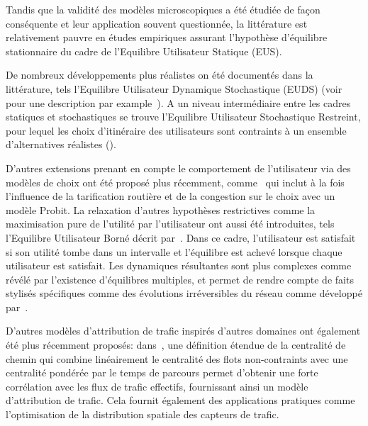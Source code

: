 {Tandis que la validité des modèles microscopiques a été étudiée de façon conséquente et leur application souvent questionnée, la littérature est relativement pauvre en études empiriques assurant l'hypothèse d'équilibre stationnaire du cadre de l'Equilibre Utilisateur Statique (EUS).

De nombreux développements plus réalistes on été documentés dans la littérature, tels l'Equilibre Utilisateur Dynamique Stochastique (EUDS) (voir pour une description par example~\cite{han2003dynamic}). A un niveau intermédiaire entre les cadres statiques et stochastiques se trouve l'Equilibre Utilisateur Stochastique Restreint, pour lequel les choix d'itinéraire des utilisateurs sont contraints à un ensemble d'alternatives réalistes (\cite{rasmussen2015stochastic}).

D'autres extensions prenant en compte le comportement de l'utilisateur via des modèles de choix ont été proposé plus récemment, comme~\cite{zhang2013dynamic} qui inclut à la fois l'influence de la tarification routière et de la congestion sur le choix avec un modèle Probit. La relaxation d'autres hypothèses restrictives comme la maximisation pure de l'utilité par l'utilisateur ont aussi été introduites, tels l'Equilibre Utilisateur Borné décrit par~\cite{mahmassani1987boundedly}. Dans ce cadre, l'utilisateur est satisfait si son utilité tombe dans un intervalle et l'équilibre est achevé lorsque chaque utilisateur est satisfait. Les dynamiques résultantes sont plus complexes comme révélé par l'existence d'équilibres multiples, et permet de rendre compte de faits stylisés spécifiques comme des évolutions irréversibles du réseau comme développé par~\cite{guo2011bounded}.

D'autres modèles d'attribution de trafic inspirés d'autres domaines ont également été plus récemment proposés: dans~\cite{puzis2013augmented}, une définition étendue de la centralité de chemin qui combine linéairement le centralité des flots non-contraints avec une centralité pondérée par le temps de parcours permet d'obtenir une forte corrélation avec les flux de trafic effectifs, fournissant ainsi un modèle d'attribution de trafic. Cela fournit également des applications pratiques comme l'optimisation de la distribution spatiale des capteurs de trafic.
}

